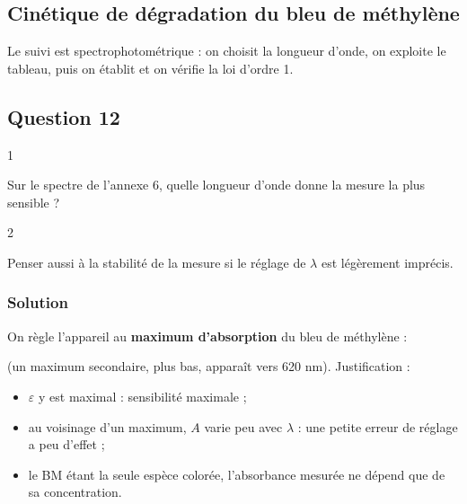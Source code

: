 \documentclass[11pt,a4paper]{article}
\providecommand{\tightlist}{\setlength{\itemsep}{0pt}\setlength{\parskip}{0pt}}
\newcommand{\equationajustee}[1]{%
  \sbox{\boiteequation}{$\displaystyle #1$}%
  \ifdim\wd\boiteequation>\linewidth
    \[\resizebox{\linewidth}{!}{\usebox{\boiteequation}}\]%
  \else
    \[#1\]%
  \fi}
\begin{document}
\hypertarget{cinuxe9tique-de-duxe9gradation-du-bleu-de-muxe9thyluxe8ne}{%
\subsection{Cinétique de dégradation du bleu de méthylène}\label{cinuxe9tique-de-duxe9gradation-du-bleu-de-muxe9thyluxe8ne}}

Le suivi est spectrophotométrique : on choisit la longueur d'onde, on exploite le tableau, puis on établit et on vérifie la loi d'ordre 1.

\hypertarget{question-12}{%
\subsection{Question 12}\label{question-12}}

\begin{indication}{1}

Sur le spectre de l'annexe 6, quelle longueur d'onde donne la mesure la plus sensible ?

\end{indication}

\begin{indication}{2}

Penser aussi à la stabilité de la mesure si le réglage de \(\lambda\) est légèrement imprécis.

\end{indication}

\hypertarget{solution-11}{%
\subsubsection{Solution}\label{solution-11}}

On règle l'appareil au \textbf{maximum d'absorption} du bleu de méthylène :

\equationajustee{\boxed{\lambda\approx665\ \mathrm{nm}}}

(un maximum secondaire, plus bas, apparaît vers 620 nm). Justification :

\begin{itemize}
\tightlist
\item
  \(\varepsilon\) y est maximal : sensibilité maximale ;
\item
  au voisinage d'un maximum, \(A\) varie peu avec \(\lambda\) : une petite erreur de réglage a peu d'effet ;
\item
  le BM étant la seule espèce colorée, l'absorbance mesurée ne dépend que de sa concentration.
\end{itemize}
\end{document}
